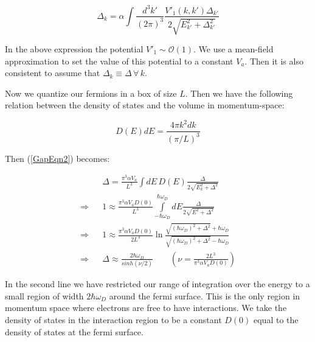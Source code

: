 \begin{doublespace}
\begin{equation}\label{GapEqn2}
    \Delta_k = \alpha \int \frac{d^3k'}{(2\pi)^3} \frac{V'_1(k,k')\Delta_{k'}}{2\sqrt{E_{k'}^2 + \Delta_{k'}^2}}
\end{equation}

In the above expression the potential  $ V'_1 \sim \mathcal{O}(1)$. We use a mean-field
approximation to set the value of this potential to a constant $V_a$. Then it is also consistent to
assume that $\Delta_k \equiv \Delta \, \forall \, k$.

Now we quantize our fermions in a box of size $L$. Then we have the following relation between the
density of states and the volume in momentum-space:

\begin{equation}\label{DOS}
    D(E)dE = \frac{4 \pi k^2 dk}{(\pi/L)^3}
\end{equation}

Then (\ref{GapEqn2}) becomes:

\begin{eqnarray}\label{GapEqn3}
    && \Delta = \frac{ \pi^3 \alpha V_a}{L^3} \int dE \, D(E) \frac{\Delta}{2\sqrt{E_k^2 +
    \Delta^2}} \nonumber \\
    \Rightarrow && 1 \approx \frac{\pi^3 \alpha V_a D(0)}{L^3} \int\limits_{-\hbar\omega_D}^{\hbar\omega_D} dE \frac{\Delta}{2\sqrt{E^2 +
    \Delta^2}} \nonumber \\
    \Rightarrow && 1 \approx \frac{\pi^3 \alpha V_a D(0)}{2L^3}
    \ln\frac{\sqrt{(\hbar\omega_D)^2 + \Delta^2} + \hbar\omega_D}{\sqrt{(\hbar\omega_D)^2 + \Delta^2} - \hbar\omega_D} \nonumber \\
    \Rightarrow && \Delta \approx \frac{2\hbar\omega_D }{sinh(\nu/2)} \qquad \left(\nu = \frac{2 L^3}{\pi^3 \alpha V_a D(0)} \right)
\end{eqnarray}

In the second line we have restricted our range of integration over the energy to a small region of
width $2\hbar \omega_D$ around the fermi surface. This is the only region in momentum space where
electrons are free to have interactions. We take the density of states in the interaction region to
be a constant $D(0)$ equal to the density of states at the fermi surface.

%
%


\end{doublespace}
